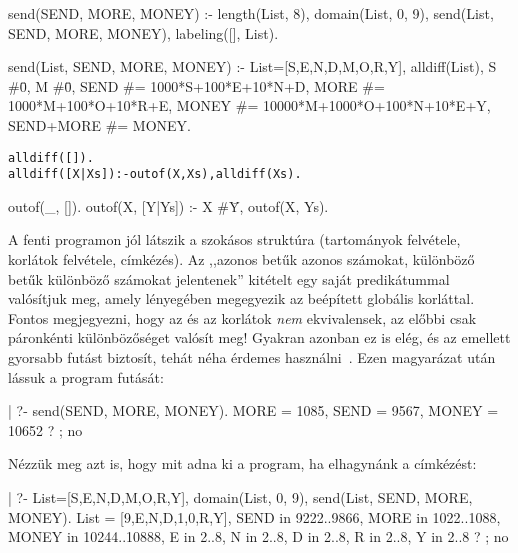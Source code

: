 \begin{prologcode}
send(SEND, MORE, MONEY) :-
  length(List, 8),
  domain(List, 0, 9),               %
  send(List, SEND, MORE, MONEY),    %
  labeling([], List).               %
\end{prologcode}
\begin{prologcode}
send(List, SEND, MORE, MONEY) :-
  List=[S,E,N,D,M,O,R,Y],
  alldiff(List), S #\= 0, M #\= 0,
  SEND #=  1000*S+100*E+10*N+D,
  MORE #= 1000*M+100*O+10*R+E,
  MONEY #= 10000*M+1000*O+100*N+10*E+Y,
  SEND+MORE #= MONEY.
\end{prologcode}
\begin{alltt}
% alldiff(L): L elemei mind különbözőek (buta megvalósítás).
% Lényegében azonos a beépített all_different/1 kombinatorikai globális korláttal.
alldiff([]).
alldiff([X|Xs]) :- outof(X, Xs), alldiff(Xs).
\end{alltt}
\begin{prologcode}
outof(_, []).
outof(X, [Y|Ys]) :- X #\= Y, outof(X, Ys).
\end{prologcode}

A fenti programon jól látszik a szokásos \clpfd struktúra (tartományok
felvétele, korlátok felvétele, címkézés). Az ,,azonos betűk azonos számokat,
különböző betűk különböző számokat jelentenek'' kitételt egy saját
 predikátummal valósítjuk meg, amely lényegében megegyezik
az  beépített globális korláttal. Fontos megjegyezni,
hogy az  és az  korlátok \emph{nem}
ekvivalensek, az előbbi csak páronkénti különbözőséget valósít meg! Gyakran
azonban ez is elég, és az  emellett gyorsabb futást biztosít,
tehát néha érdemes használni~\cite{DBLP:conf/aaai/Regin94}. Ezen magyarázat után lássuk a program futását:

\begin{prologcode}
| ?- send(SEND, MORE, MONEY).
MORE = 1085, SEND = 9567, MONEY = 10652 ? ;
no
\end{prologcode}

Nézzük meg azt is, hogy mit adna ki a program, ha elhagynánk a címkézést:

\begin{prologcode}
| ?- List=[S,E,N,D,M,O,R,Y], domain(List, 0, 9),
     send(List, SEND, MORE, MONEY).
        List = [9,E,N,D,1,0,R,Y],
        SEND in 9222..9866,
        MORE in 1022..1088,
        MONEY in 10244..10888,
        E in 2..8, N in 2..8, D in 2..8,
        R in 2..8, Y in 2..8 ? ; no
\end{prologcode}


